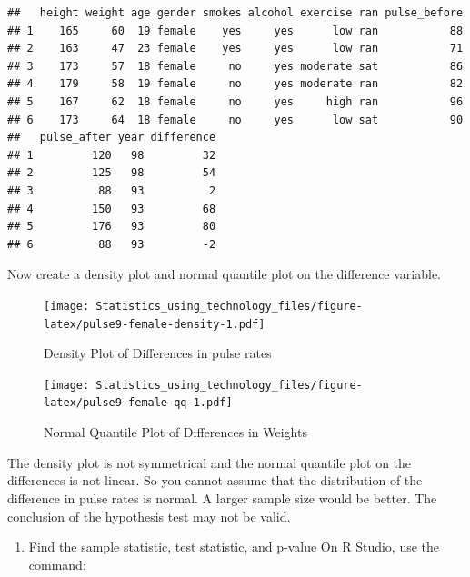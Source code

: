 \documentclass[]{book}
\newenvironment{Shaded}{\begin{snugshade}}{\end{snugshade}}
\newcommand{\DataTypeTok}[1]{\textcolor[rgb]{0.13,0.29,0.53}{#1}}
\newcommand{\KeywordTok}[1]{\textcolor[rgb]{0.13,0.29,0.53}{\textbf{#1}}}
\newcommand{\NormalTok}[1]{#1}
\newcommand{\OperatorTok}[1]{\textcolor[rgb]{0.81,0.36,0.00}{\textbf{#1}}}
\newcommand{\StringTok}[1]{\textcolor[rgb]{0.31,0.60,0.02}{#1}}
\providecommand{\tightlist}{%
  \setlength{\itemsep}{0pt}\setlength{\parskip}{0pt}}
\begin{document}
\begin{Shaded}
\end{Shaded}

\begin{verbatim}
##   height weight age gender smokes alcohol exercise ran pulse_before
## 1    165     60  19 female    yes     yes      low ran           88
## 2    163     47  23 female    yes     yes      low ran           71
## 3    173     57  18 female     no     yes moderate sat           86
## 4    179     58  19 female     no     yes moderate ran           82
## 5    167     62  18 female     no     yes     high ran           96
## 6    173     64  18 female     no     yes      low sat           90
##   pulse_after year difference
## 1         120   98         32
## 2         125   98         54
## 3          88   93          2
## 4         150   93         68
## 5         176   93         80
## 6          88   93         -2
\end{verbatim}

Now create a density plot and normal quantile plot on the difference variable.



\begin{figure}
\centering
\texttt{[image: Statistics\_using\_technology\_files/figure-latex/pulse9-female-density-1.pdf]}
\caption{\label{fig:pulse9-female-density}Density Plot of Differences in pulse rates}
\end{figure}



\begin{figure}
\centering
\texttt{[image: Statistics\_using\_technology\_files/figure-latex/pulse9-female-qq-1.pdf]}
\caption{\label{fig:pulse9-female-qq}Normal Quantile Plot of Differences in Weights}
\end{figure}

The density plot is not symmetrical and the normal quantile plot on the differences is not linear.
So you cannot assume that the distribution of the difference in pulse rates is normal. A larger sample size would be better. The conclusion of the hypothesis test may not be valid.

\begin{enumerate}
\def\labelenumi{\arabic{enumi}.}
\setcounter{enumi}{3}
\tightlist
\item
  Find the sample statistic, test statistic, and p-value
  On R Studio, use the command:
\end{enumerate}
\end{document}
